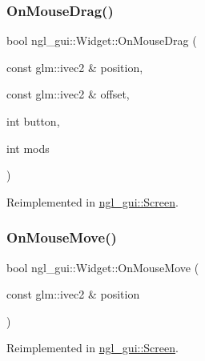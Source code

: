 \mbox{\label{classngl__gui_1_1_widget_aac19447b726ccec8ea22992b19edc676}} 
\subsubsection{\texorpdfstring{On\+Mouse\+Drag()}{OnMouseDrag()}}
{\footnotesize\ttfamily bool ngl\+\_\+gui\+::\+Widget\+::\+On\+Mouse\+Drag (\begin{DoxyParamCaption}\item[{const glm\+::ivec2 \&}]{position,  }\item[{const glm\+::ivec2 \&}]{offset,  }\item[{int}]{button,  }\item[{int}]{mods }\end{DoxyParamCaption})\hspace{0.3cm}{\ttfamily [virtual]}}



Reimplemented in \mbox{\hyperlink{classngl__gui_1_1_screen_a532892ea85fdc456ef7d891a1a21694e}{ngl\+\_\+gui\+::\+Screen}}.

\mbox{\label{classngl__gui_1_1_widget_ac5d4927cc0bd0300d0b2e00d9f64d176}} 
\subsubsection{\texorpdfstring{On\+Mouse\+Move()}{OnMouseMove()}}
{\footnotesize\ttfamily bool ngl\+\_\+gui\+::\+Widget\+::\+On\+Mouse\+Move (\begin{DoxyParamCaption}\item[{const glm\+::ivec2 \&}]{position }\end{DoxyParamCaption})\hspace{0.3cm}{\ttfamily [virtual]}}



Reimplemented in \mbox{\hyperlink{classngl__gui_1_1_screen_a2f56b25db5dbde69c8c80404a55aa2fd}{ngl\+\_\+gui\+::\+Screen}}.

\mbox{\label{classngl__gui_1_1_widget_a754155677479020794938b90229aba58}} 
